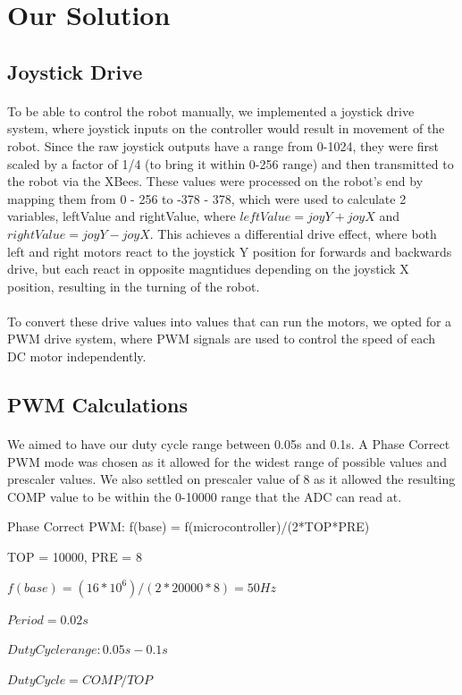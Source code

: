 \documentclass[12pt, a4paper]{article}
\begin{document}
\section{Our Solution} \label{sec:Solution}
\subsection{Joystick Drive}
  \paragraph{}
    To be able to control the robot manually, we implemented a joystick drive system, where joystick inputs on the controller would result in movement of the robot. Since the raw joystick outputs have a range from 0-1024, they were first scaled by a factor of 1/4 (to bring it within 0-256 range) and then transmitted to the robot via the XBees.
    These values were processed on the robot's end by mapping them from 0 - 256 to -378 - 378, which were used to calculate 2 variables, leftValue and rightValue, where $leftValue = joyY + joyX$ and $rightValue = joyY - joyX$.
    This achieves a differential drive effect, where both left and right motors react to the joystick Y position for forwards and backwards drive, but each react in opposite magntidues depending on the joystick X position, resulting in the turning of the robot.
  \paragraph{}
    To convert these drive values into values that can run the motors, we opted for a PWM drive system, where PWM signals are used to control the speed of each DC motor independently.
\subsection{PWM Calculations}
  \paragraph{}
    We aimed to have our duty cycle range between 0.05s and 0.1s.
    A Phase Correct PWM mode was chosen as it allowed for the widest range of possible values and prescaler values.
    We also settled on prescaler value of 8 as it allowed the resulting COMP value to be within the 0-10000 range that the ADC can read at.

    Phase Correct PWM: f(base) = f(microcontroller)/(2*TOP*PRE)

    TOP = 10000, PRE = 8

    $f(base) = (16*10^6) / (2*20000*8) = 50Hz$
    
    $Period = 0.02s$

    $Duty Cycle range: 0.05s - 0.1s$

    $Duty Cycle = COMP/TOP$
\end{document}
